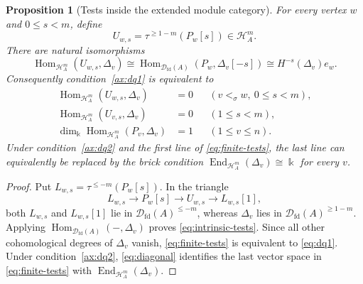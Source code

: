 \documentclass[11pt,a4paper]{article}
\newcommand{\defn}[1]{\textsl{\color{darkblue} #1}}
\newcommand{\D}{\mathcal D}
\renewcommand{\H}{\mathcal H}
\newcommand{\std}{\Delta}
\DeclareMathOperator{\fd}{fd}
\DeclareMathOperator{\Hom}{Hom}
\DeclareMathOperator{\End}{End}
\theoremstyle{plain}
\newtheorem{proposition}[theorem]{Proposition}
\theoremstyle{definition}
\numberwithin{equation}{section}
\begin{document}
\begin{proposition}[Tests inside the extended module category]
\label{prop:finite-tests}
For every vertex $w$ and $0\leq s<m$, define
\begin{equation}\label{eq:truncated-projectives}
 U_{w,s}=\tau^{\geq1-m}(P_w[s])\in\H_A^m.
\end{equation}
There are natural isomorphisms
\begin{equation}\label{eq:intrinsic-tests}
 \Hom_{\H_A^m}(U_{w,s},\std_v)
 \cong\Hom_{\D_{\fd}(A)}(P_w,\std_v[-s])
 \cong H^{-s}(\std_v)e_w.
\end{equation}
Consequently condition~\ref{ax:dq1} is equivalent to
\begin{equation}\label{eq:finite-tests}
 \begin{aligned}
 \Hom_{\H_A^m}(U_{w,s},\std_v)&=0
 &&(v<_\sigma w,\ 0\leq s<m),\\
 \Hom_{\H_A^m}(U_{v,s},\std_v)&=0
 &&(1\leq s<m),\\
 \dim_{\Bbbk}\Hom_{\H_A^m}(P_v,\std_v)&=1
 &&(1\leq v\leq n).
 \end{aligned}
\end{equation}
Under condition~\ref{ax:dq2} and the first line of
\eqref{eq:finite-tests}, the last line can equivalently be replaced
by the \defn{brick condition}
$\End_{\H_A^m}(\std_v)\cong\Bbbk$ for every $v$.
\end{proposition}
\begin{proof}
Put $L_{w,s}=\tau^{\leq-m}(P_w[s])$. In the triangle
\[
 L_{w,s}\longrightarrow P_w[s]\longrightarrow U_{w,s}
 \longrightarrow L_{w,s}[1],
\]
both $L_{w,s}$ and $L_{w,s}[1]$ lie in
$\D_{\fd}(A)^{\leq-m}$, whereas $\std_v$ lies in
$\D_{\fd}(A)^{\geq1-m}$. Applying
$\Hom_{\D_{\fd}(A)}(-,\std_v)$ proves
\eqref{eq:intrinsic-tests}. Since all other cohomological degrees
of $\std_v$ vanish, \eqref{eq:finite-tests} is equivalent to
\eqref{eq:dq1}. Under condition~\ref{ax:dq2},
\eqref{eq:diagonal} identifies the last vector space in
\eqref{eq:finite-tests} with $\End_{\H_A^m}(\std_v)$.
\end{proof}
\end{document}
